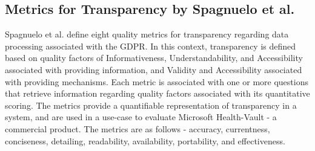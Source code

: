 \subsection{Metrics for Transparency by Spagnuelo et al.}
Spagnuelo et al. \cite{livraga_metrics_2016} define eight quality metrics for transparency regarding data processing associated with the GDPR.
In this context, transparency is defined based on quality factors of Informativeness, Understandability, and Accessibility associated with providing information, and Validity and Accessibility associated with providing mechanisms.
Each metric is associated with one or more questions that retrieve information regarding quality factors associated with its quantitative scoring.
The metrics provide a quantifiable representation of transparency in a system, and are used in a use-case to evaluate Microsoft Health-Vault - a commercial product.
The metrics are as follows - accuracy, currentness, conciseness, detailing, readability, availability, portability, and effectiveness.

